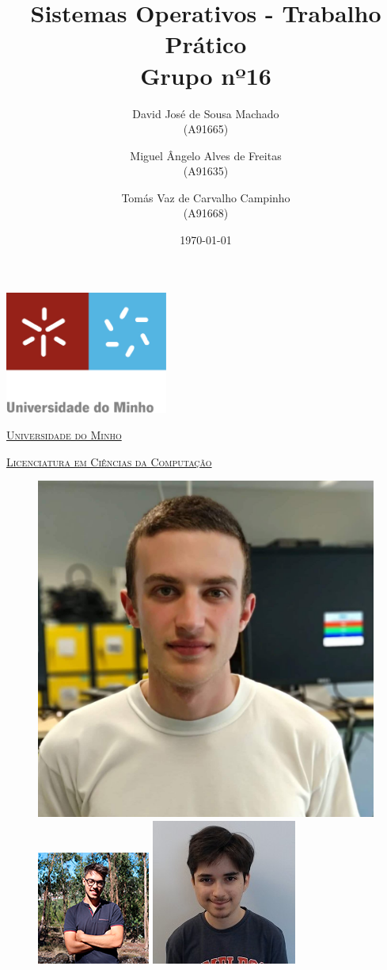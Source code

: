 \documentclass[a4paper]{report}
\title{Sistemas Operativos - Trabalho Prático\\
	\large Grupo nº16}
\author{David José de Sousa Machado  \\ (A91665) \and Miguel Ângelo Alves de Freitas \\ (A91635)
         \and Tomás Vaz de Carvalho Campinho \\ (A91668)
       } %
\date{\today} %
\begin{document}
	\begin{minipage}{0.9\linewidth}
        \centering
		\includegraphics[width=0.4\textwidth]{um.jpg}\par\vspace{1cm}
		\href{https://www.uminho.pt/PT}
		{\scshape\LARGE Universidade do Minho} \par
		\vspace{0.6cm}
		\href{https://lcc.di.uminho.pt}
		{\scshape\Large Licenciatura em Ciências da Computação} \par
		\maketitle
		\begin{figure}[H]
			\includegraphics[width=0.32\linewidth]{David.jpg}
			\includegraphics[width=0.32\linewidth]{miguel.png}
			\includegraphics[width=0.32\linewidth]{tomas.jpg}
		\end{figure}
	\end{minipage}
	
\end{document}
